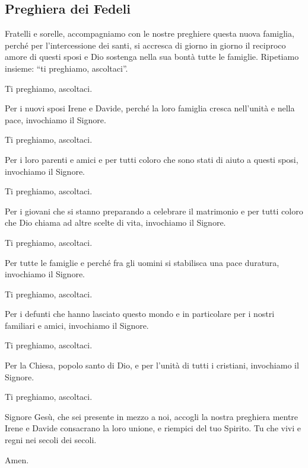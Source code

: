 
\subsection*{Preghiera dei Fedeli}

	\begin{dialoghisalmo}
		\item[\sacerdote] Fratelli e sorelle, accompagniamo con le nostre preghiere questa nuova famiglia, perché per l'intercessione dei santi, si accresca di giorno in giorno il reciproco amore di questi sposi e Dio sostenga nella sua bontà tutte le famiglie. Ripetiamo insieme: \textquotedblleft ti preghiamo, ascoltaci\textquotedblright.
		\item[\assemblea] Ti preghiamo, ascoltaci.
		\item[\lettore] Per i nuovi sposi Irene e Davide, perché la loro famiglia cresca nell'unità e nella pace, invochiamo il Signore.
		\item[\assemblea] Ti preghiamo, ascoltaci.
		\item[\lettore] Per i loro parenti e amici e per tutti coloro che sono stati di aiuto a questi sposi, invochiamo il Signore.
		\item[\assemblea] Ti preghiamo, ascoltaci.
		\item[\lettore] Per i giovani che si stanno preparando a celebrare il matrimonio e per tutti coloro che Dio chiama ad altre scelte di vita, invochiamo il Signore.
		\item[\assemblea] Ti preghiamo, ascoltaci.
		\item[\lettore] Per tutte le famiglie e perché fra gli uomini si stabilisca una pace duratura, invochiamo il Signore.
		\item[\assemblea] Ti preghiamo, ascoltaci.
		\item[\lettore] Per i defunti che hanno lasciato questo mondo e in particolare per i nostri familiari e amici, invochiamo il Signore.
		\item[\assemblea] Ti preghiamo, ascoltaci.
		\item[\lettore] Per la Chiesa, popolo santo di Dio, e per l'unità di tutti i cristiani, invochiamo il Signore.
		\item[\assemblea] Ti preghiamo, ascoltaci.
		\item[\sacerdote] Signore Gesù, che sei presente in mezzo a noi, accogli la nostra preghiera mentre Irene e Davide consacrano la loro unione, e riempici del tuo Spirito. Tu che vivi e regni nei secoli dei secoli.
		\item[\assemblea] Amen.
	\end{dialoghisalmo}


